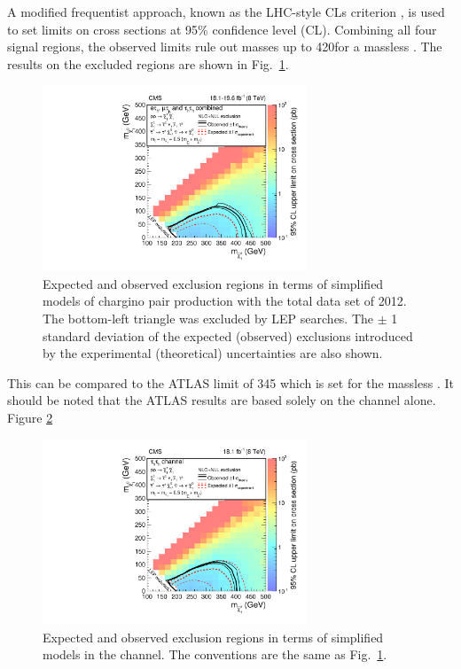 A modified frequentist approach, known as the LHC-style CLs criterion \cite{read:CLs,Junk:1999kv,ATLAS:2011tau}, is used to 
set limits on cross sections at 95\% confidence level (CL).
Combining all four signal regions,
the observed limits rule out \chione  masses up to  420\GeV  for a massless \PSGczDo.  
The results on the excluded regions are shown in Fig.~\ref{fig:limit_final}. 
\begin{linenomath}
\begin{figure}[!htb]
\centering
\includegraphics[width=0.7\textwidth,keepaspectratio=true]{StatisticsFig/Exclusion4Bins.pdf}
\caption{Expected and observed exclusion regions in terms of simplified models of
chargino pair production 
with the total data set of 2012. The bottom-left triangle was excluded by LEP \sTau searches.
The $\pm$ 1 standard deviation of the expected (observed) exclusions introduced by the experimental 
(theoretical) uncertainties are also shown.}
\label{fig:limit_final}
\end{figure}
\end{linenomath}
This can be compared to the ATLAS limit of 345\GeV \cite{Aad:2014yka} which is set for the massless \PSGczDo.
It should be noted that the ATLAS results are based solely on the \tauTau channel alone. Figure 
\ref{fig:limit_tauTau} 
\begin{linenomath}
\begin{figure}[!htb]
\centering
\includegraphics[width=0.7\textwidth,keepaspectratio=true]{StatisticsFig/ExclusionTauTau2Bin.pdf}
\caption{Expected and observed exclusion regions in terms of simplified models
in the \tauTau channel. The conventions are the same as Fig.~\ref{fig:limit_final}.}
\label{fig:limit_tauTau}
\end{figure}
\end{linenomath}
